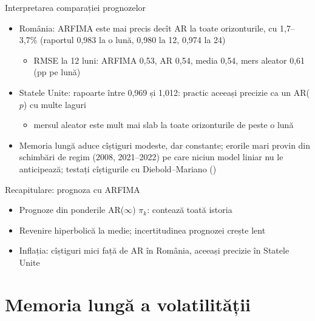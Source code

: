 \begin{frame}{Interpretarea comparației prognozelor}
\itemsize{\small}
\begin{itemize}
    \item România: ARFIMA este mai precis decît AR la toate orizonturile, cu 1{,}7--3{,}7\% (raportul 0{,}983 la o lună, 0{,}980 la 12, 0{,}974 la 24)
    \begin{itemize}
        \item RMSE la 12 luni: ARFIMA 0{,}53, AR 0{,}54, media 0{,}54, mers aleator 0{,}61 (pp pe lună)
    \end{itemize}
    \item Statele Unite: rapoarte între 0{,}969 și 1{,}012: practic aceeași precizie ca un AR($p$) cu multe laguri
    \begin{itemize}
        \item mersul aleator este mult mai slab la toate orizonturile de peste o lună
    \end{itemize}
    \item Memoria lungă aduce cîștiguri modeste, dar constante; erorile mari provin din schimbări de regim (2008, 2021--2022) pe care niciun model liniar nu le anticipează; testați cîștigurile cu Diebold--Mariano ()
\end{itemize}
\end{frame}

\begin{frame}{Recapitulare: prognoza cu ARFIMA}
\itemsize{\small}
\begin{itemize}
    \item Prognoze din ponderile AR($\infty$) $\pi_k$: contează toată istoria
    \item Revenire hiperbolică la medie; incertitudinea prognozei crește lent
    \item Inflația: cîștiguri mici față de AR în România, aceeași precizie în Statele Unite
\end{itemize}
\end{frame}


\section{Memoria lungă a volatilității}

